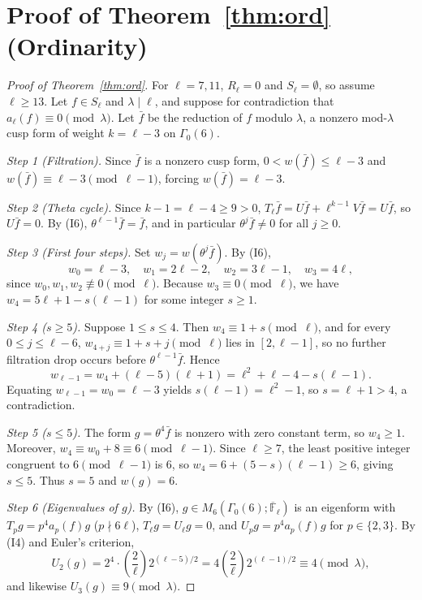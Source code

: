 \documentclass[11pt,reqno]{amsart}
\theoremstyle{definition}
\theoremstyle{remark}
\newcommand{\F}{\mathbb{F}}
\newcommand{\legendre}[2]{\left(\frac{#1}{#2}\right)}
\begin{document}
\section{Proof of Theorem~\ref{thm:ord} (Ordinarity)}\label{sec:proofA}

\begin{proof}[Proof of Theorem~\ref{thm:ord}]
For $\ell = 7, 11$, $R_\ell = 0$ and $S_\ell = \emptyset$, so assume $\ell \ge 13$. Let $f \in S_\ell$ and $\lambda \mid \ell$, and suppose for contradiction that $a_\ell(f) \equiv 0 \pmod{\lambda}$. Let $\bar{f}$ be the reduction of $f$ modulo $\lambda$, a nonzero mod-$\lambda$ cusp form of weight $k = \ell - 3$ on $\Gamma_0(6)$.

\emph{Step 1 (Filtration).} Since $\bar{f}$ is a nonzero cusp form, $0 < w(\bar{f}) \le \ell - 3$ and $w(\bar{f}) \equiv \ell - 3 \pmod{\ell - 1}$, forcing $w(\bar{f}) = \ell - 3$.

\emph{Step 2 (Theta cycle).} Since $k - 1 = \ell - 4 \ge 9 > 0$, $T_\ell \bar{f} = U\bar{f} + \ell^{k-1} V\bar{f} = U\bar{f}$, so $U\bar{f} = 0$. By (I6), $\theta^{\ell-1}\bar{f} = \bar{f}$, and in particular $\theta^j\bar{f} \neq 0$ for all $j \ge 0$.

\emph{Step 3 (First four steps).} Set $w_j = w(\theta^j \bar{f})$. By (I6),
\[
  w_0 = \ell - 3,\quad w_1 = 2\ell - 2,\quad w_2 = 3\ell - 1,\quad w_3 = 4\ell,
\]
since $w_0, w_1, w_2 \not\equiv 0 \pmod{\ell}$. Because $w_3 \equiv 0 \pmod{\ell}$, we have $w_4 = 5\ell + 1 - s(\ell - 1)$ for some integer $s \ge 1$.

\emph{Step 4 ($s \ge 5$).} Suppose $1 \le s \le 4$. Then $w_4 \equiv 1 + s \pmod{\ell}$, and for every $0 \le j \le \ell - 6$, $w_{4+j} \equiv 1 + s + j \pmod{\ell}$ lies in $[2, \ell - 1]$, so no further filtration drop occurs before $\theta^{\ell-1}\bar{f}$. Hence
\[
  w_{\ell-1} = w_4 + (\ell - 5)(\ell + 1) = \ell^2 + \ell - 4 - s(\ell - 1).
\]
Equating $w_{\ell-1} = w_0 = \ell - 3$ yields $s(\ell - 1) = \ell^2 - 1$, so $s = \ell + 1 > 4$, a contradiction.

\emph{Step 5 ($s \le 5$).} The form $g = \theta^4 \bar{f}$ is nonzero with zero constant term, so $w_4 \ge 1$. Moreover, $w_4 \equiv w_0 + 8 \equiv 6 \pmod{\ell - 1}$. Since $\ell \ge 7$, the least positive integer congruent to $6 \pmod{\ell - 1}$ is $6$, so $w_4 = 6 + (5 - s)(\ell - 1) \ge 6$, giving $s \le 5$. Thus $s = 5$ and $w(g) = 6$.

\emph{Step 6 (Eigenvalues of $g$).} By (I6), $g \in M_6(\Gamma_0(6); \overline{\F}_\ell)$ is an eigenform with $T_p g = p^4 a_p(f) g$ ($p \nmid 6\ell$), $T_\ell g = U_\ell g = 0$, and $U_p g = p^4 a_p(f) g$ for $p \in \{2,3\}$. By (I4) and Euler's criterion,
\[
  U_2(g) = 2^4 \cdot \legendre{2}{\ell} 2^{(\ell-5)/2} = 4\legendre{2}{\ell} 2^{(\ell-1)/2} \equiv 4 \pmod{\lambda},
\]
and likewise $U_3(g) \equiv 9 \pmod{\lambda}$.


\end{proof}
\end{document}
